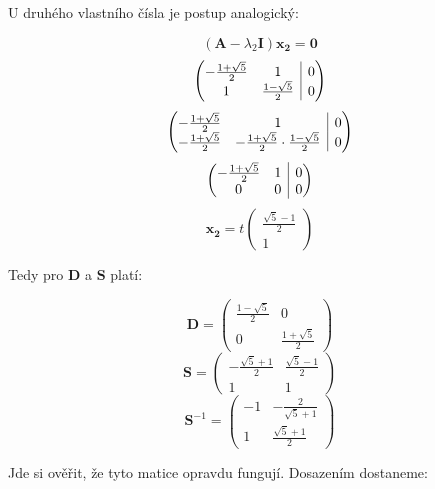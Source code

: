 \documentclass{fkssolpub}
\makeatletter
\newenvironment{amatrix}[1]{%
  \left(\begin{array}{@{}*{#1}{c}|c@{}}
}{%
  \end{array}\right)
}
\makeatother
\begin{document}
U druhého vlastního čísla je postup analogický:

\[
  (\mathbf{A} - \lambda_2 \mathbf{I}) \mathbf{x_2} = \mathbf{0}
\]
\[
  \begin{amatrix}{2}
    - \frac{1 + \sqrt{5}}{2} & 1 & 0 \\
    1 & \frac{1 - \sqrt{5}}{2} & 0
  \end{amatrix}
\]
\[
  \begin{amatrix}{2}
    - \frac{1 + \sqrt{5}}{2} & 1 & 0 \\
    - \frac{1 + \sqrt{5}}{2} & - \frac{1 + \sqrt{5}}{2} \cdot \frac{1 - \sqrt{5}}{2} & 0
  \end{amatrix}
\]
\[
  \begin{amatrix}{2}
    - \frac{1 + \sqrt{5}}{2} & 1 & 0 \\
    0 & 0 & 0
  \end{amatrix}
\]
\[
  \mathbf{x_2} = t \begin{pmatrix}
    \frac{\sqrt{5} - 1}{2} \\ 1
  \end{pmatrix}
\]

Tedy pro $\mathbf{D}$ a $\mathbf{S}$ platí:

\[
  \mathbf{D} = \begin{pmatrix}
    \frac{1 - \sqrt{5}}{2} & 0 \\
    0 & \frac{1 + \sqrt{5}}{2}
  \end{pmatrix}
\]
\[
  \mathbf{S} = \begin{pmatrix}
    - \frac{\sqrt{5} + 1}{2} & \frac{\sqrt{5} - 1}{2} \\
    1 & 1
  \end{pmatrix}
\]
\[
  \mathbf{S}^{-1} = \left(\begin{array}{rr}
-1 & -\frac{2}{\sqrt{5} + 1} \\
1 & \frac{\sqrt{5} + 1}{2}
\end{array}\right)
\]

Jde si ověřit, že tyto matice opravdu fungují. Dosazením dostaneme:
\end{document}

